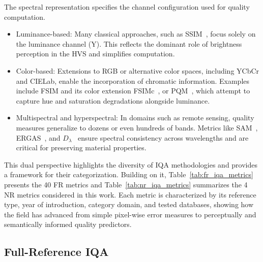The spectral representation specifies the channel configuration used for quality computation.

\begin{itemize}
  \item Luminance-based: Many classical approaches, such as SSIM~\cite{wang2004image}, focus solely on the luminance channel (Y). This reflects the dominant role of brightness perception in the \acs{HVS} and simplifies computation.
  \item Color-based: Extensions to RGB or alternative color spaces, including YCbCr and CIELab, enable the incorporation of chromatic information. Examples include FSIM and its color extension FSIMc~\cite{zhang2011fsim}, or PQM~\cite{wang2002uqi}, which attempt to capture hue and saturation degradations alongside luminance.
  \item Multispectral and hyperspectral: In domains such as remote sensing, quality measures generalize to dozens or even hundreds of bands. Metrics like SAM~\cite{yuhas1992sam}, ERGAS~\cite{wald2000ergas}, and $D_\lambda$~\cite{ivc} ensure spectral consistency across wavelengths and are critical for preserving material properties.
\end{itemize}

This dual perspective highlights the diversity of \acs{IQA} methodologies and provides a framework for their categorization. Building on it, Table~\ref{tab:fr_iqa_metrics} presents the 40 \acs{FR} metrics and Table~\ref{tab:nr_iqa_metrics} summarizes the 4 \acs{NR} metrics considered in this work. Each metric is characterized by its reference type, year of introduction, category domain, and tested databases, showing how the field has advanced from simple pixel-wise error measures to perceptually and semantically informed quality predictors.

\subsection{Full-Reference \acs{IQA}}\label{sec:full_reference_iqa}

